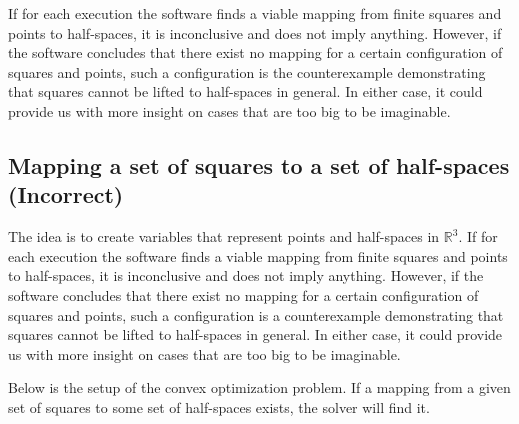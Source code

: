 \documentclass{NSF}
\begin{document}
If for each execution the software finds a viable mapping from finite squares and points to half-spaces, it is inconclusive and does not imply anything. However, if the software concludes that there exist no mapping for a certain configuration of squares and points, such a configuration is the counterexample demonstrating that squares cannot be lifted to half-spaces in general. In either case, it could provide us with more insight on cases that are too big to be imaginable.

\subsection{Mapping a set of squares to a set of half-spaces (Incorrect) }
 The idea is to create variables that represent points and half-spaces in $\mathbb{R}^3$. If for each execution the software finds a viable mapping from finite squares and points to half-spaces, it is inconclusive and does not imply anything. However, if the software concludes that there exist no mapping for a certain configuration of squares and points, such a configuration is a counterexample demonstrating that squares cannot be lifted to half-spaces in general. In either case, it could provide us with more insight on cases that are too big to be imaginable.

Below is the setup of the convex optimization problem. If a mapping from a given set of squares to some set of half-spaces exists, the solver will find it.
\end{document}
